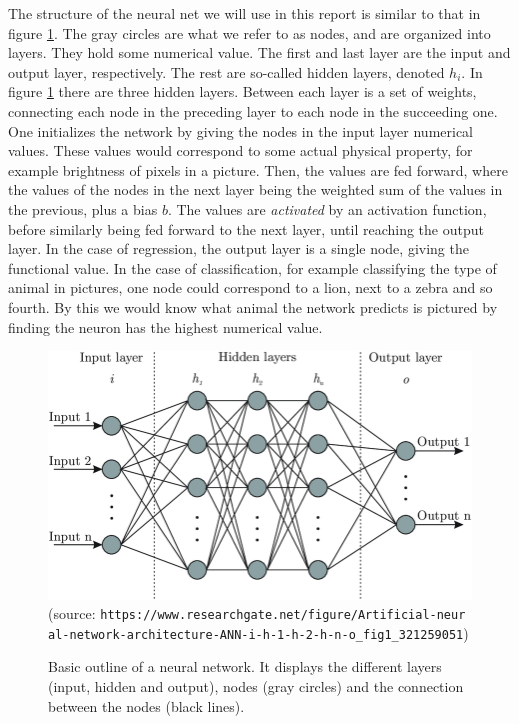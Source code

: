 \documentclass[12pt]{extarticle}
\begin{document}
The structure of the neural net we will use in this report is similar to that in figure \ref{fig:neural_network}. The gray circles are what we refer to as nodes, and are organized into layers. They hold some numerical value. The first and last layer are the input and output layer, respectively. The rest are so-called hidden layers, denoted $h_i$. In figure \ref{fig:neural_network} there are three hidden layers. Between each layer is a set of weights, connecting each node in the preceding layer to each node in the succeeding one. One initializes the network by giving the nodes in the input layer numerical values. These values would correspond to some actual physical property, for example brightness of pixels in a picture. Then, the values are fed forward, where the values of the nodes in the next layer being the weighted sum of the values in the previous, plus a bias $b$. The values are \textit{activated} by an activation function, before similarly being fed forward to the next layer, until reaching the output layer. In the case of regression, the output layer is a single node, giving the functional value. In the case of classification, for example classifying the type of animal in pictures, one node could correspond to a lion, next to a zebra and so fourth. By this we would know what animal the network predicts is pictured by finding the neuron has the highest numerical value.

\begin{figure}[h]
	\includegraphics[width=\linewidth]{pictures/neural_network.png}
	(source: \texttt{https://www.researchgate.net/figure/Artificial-neur
		al-network-architecture-ANN-i-h-1-h-2-h-n-o\_fig1\_321259051})
	\endminipage\hfill
	\caption{Basic outline of a neural network. It displays the different layers (input, hidden and output), nodes (gray circles) and the connection between the nodes (black lines).}\label{fig:neural_network}
	\endminipage
\end{figure}
\end{document}
